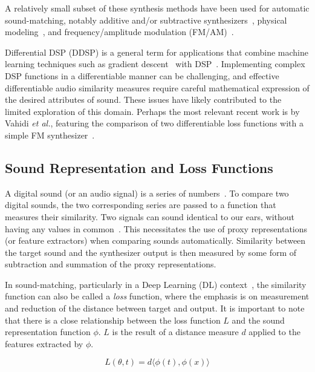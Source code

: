 \documentclass[lettersize,journal]{IEEEtran}
\providecommand{\gls}[1]{#1}
\begin{document}
A relatively small subset of these synthesis methods have been used for automatic sound-matching, notably additive and/or subtractive synthesizers~\cite{esling2019flow,yee2018automatic,mitchell2007evolutionary,salimi2020make}, physical modeling~\cite{riionheimo2003parameter}, and frequency/amplitude modulation (\gls{FM}/\gls{AM})~\cite{horner1993machine,vahidi2023mesostructures}. 

Differential DSP (\gls{DDSP}) is a general term for applications that combine machine learning techniques such as gradient descent~\cite{goodfellow2016deep,boyd2004convex} with DSP~\cite{engel2020ddsp}. Implementing complex DSP functions in a differentiable manner can be challenging, and effective differentiable audio similarity measures require careful mathematical expression of the desired attributes of sound. These issues have likely contributed to the limited exploration of this domain. Perhaps the most relevant recent work is by Vahidi \textit{et al.}, featuring the comparison of two differentiable loss functions with a simple FM synthesizer~\cite{vahidi2023mesostructures}. 

\subsection{Sound Representation and Loss Functions}
\label{sec:loss_funcs}
A digital sound (or an audio signal) is a series of numbers~\cite{smith1991viewpoints,smith2007mathematics}. To compare two digital sounds, the two corresponding series are passed to a function that measures their similarity. Two signals can sound identical to our ears, without having any values in common~\cite{moore2012introduction}. This necessitates the use of proxy representations (or feature extractors) when comparing sounds automatically. Similarity between the target sound and the synthesizer output is then measured by some form of subtraction and summation of the proxy representations.

In sound-matching, particularly in a Deep Learning (\gls{DL}) context~\cite{goodfellow2016deep}, the similarity function can also be called a \textit{loss} function, where the emphasis is on measurement and reduction of the distance between target and output. It is important to note that there is a close relationship between the loss function $L$ and the sound representation function $\phi$. $L$ is the result of a distance measure $d$ applied to the features extracted by $\phi$. 

\[
L(\theta, t) = d\langle\phi(t),\phi(x)\rangle
\]
\end{document}
